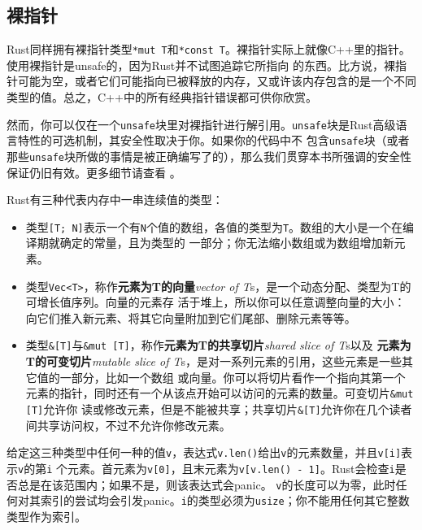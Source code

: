 \medskip
\subsection{裸指针}
Rust同样拥有裸指针类型\texttt{*mut T}和\texttt{*const T}。裸指针实际上就像C++里的指针。使用裸指针是unsafe的，因为Rust并不试图追踪它所指向
的东西。比方说，裸指针可能为空，或者它们可能指向已被释放的内存，又或许该内存包含的是一个不同类型的值。总之，C++中的所有经典指针错误都可供你欣赏。

\medskip
然而，你可以仅在一个\texttt{unsafe}块里对裸指针进行解引用。\texttt{unsafe}块是Rust高级语言特性的可选机制，其安全性取决于你。如果你的代码中不
包含\texttt{unsafe}块（或者那些\texttt{unsafe}块所做的事情是被正确编写了的），那么我们贯穿本书所强调的安全性保证仍旧有效。更多细节请查看
。

\bigskip
{}
Rust有三种代表内存中一串连续值的类型：
    \begin{itemize}
        \item 类型\texttt{[T; N]}表示一个有\texttt{N}个值的数组，各值的类型为\texttt{T}。数组的大小是一个在编译期就确定的常量，且为类型的
              一部分；你无法缩小数组或为数组增加新元素。
        \item 类型\texttt{Vec<T>}，称作\textbf{元素为T的向量}\textit{vector of T}s，是一个动态分配、类型为T的可增长值序列。向量的元素存
              活于堆上，所以你可以任意调整向量的大小：向它们推入新元素、将其它向量附加到它们尾部、删除元素等等。
        \item 类型\texttt{\&[T]}与\texttt{\&mut [T]}，称作\textbf{元素为T的共享切片}\textit{shared slice of T}s以及
              \textbf{元素为T的可变切片}\textit{mutable slice of T}s，是对一系列元素的引用，这些元素是一些其它值的一部分，比如一个数组
              或向量。你可以将切片看作一个指向其第一个元素的指针，同时还有一个从该点开始可以访问的元素的数量。可变切片\texttt{\&mut [T]}允许你
              读或修改元素，但是不能被共享；共享切片\texttt{\&[T]}允许你在几个读者间共享访问权，不过不允许你修改元素。
    \end{itemize}

\smallskip
给定这三种类型中任何一种的值\texttt{v}，表达式\texttt{v.len()}给出\texttt{v}的元素数量，并且\texttt{v[i]}表示\texttt{v}的第\texttt{i}
个元素。首元素为\texttt{v[0]}，且末元素为\texttt{v[v.len() - 1]}。Rust会检查\texttt{i}是否总是在该范围内；如果不是，则该表达式会panic。
\texttt{v}的长度可以为零，此时任何对其索引的尝试均会引发panic。\texttt{i}的类型必须为\texttt{usize}；你不能用任何其它整数类型作为索引。

